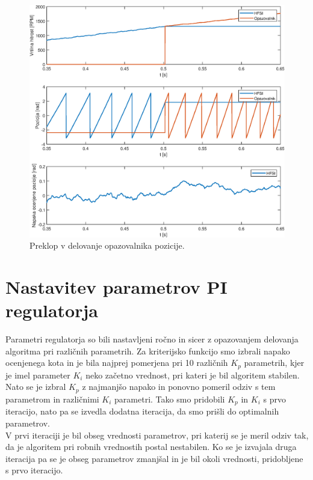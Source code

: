 \documentclass[a4paper,twoside,openright,12pt,slovene]{book}
\begin{document}
\begin{figure}[!htbp]
    \centering
    \includegraphics[width=1\columnwidth]{Slike/brezudarniPreklop.eps}
    \caption{\label{brezudarniPreklop} Preklop v delovanje opazovalnika pozicije. }
\end{figure}

\section{Nastavitev parametrov PI regulatorja}

Parametri regulatorja so bili nastavljeni ročno in sicer z opazovanjem delovanja algoritma pri različnih parametrih. Za kriterijsko funkcijo smo izbrali napako ocenjenega kota in je bila najprej pomerjena
pri 10 različnih $K_p$ parametrih, kjer je imel parameter $K_i$ neko začetno vrednost, pri kateri je bil algoritem stabilen. Nato se je izbral $K_p$ z najmanjšo napako in ponovno pomeril odziv s tem
parametrom in različnimi $K_i$ parametri. Tako smo pridobili $K_p$ in $K_i$ s prvo iteracijo, nato pa se izvedla dodatna iteracija, da smo prišli do optimalnih parametrov. 
\\
V prvi iteraciji je bil obseg vrednosti parametrov, pri katerij se je meril odziv tak, da je algoritem pri robnih vrednostih postal nestabilen. Ko se je izvajala druga iteracija pa se je obseg
parametrov zmanjšal in je bil okoli vrednosti, pridobljene s prvo iteracijo.
\\
\end{document}
